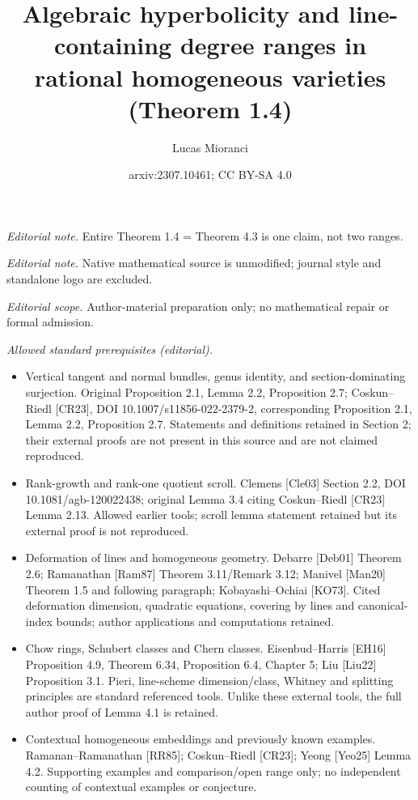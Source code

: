 \documentclass[10pt,a4paper]{article}
\title{Algebraic hyperbolicity and line-containing degree ranges in rational homogeneous varieties (Theorem 1.4)}
\author{Lucas Mioranci}
\date{arxiv:2307.10461; CC BY-SA 4.0}
\numberwithin{equation}{section}
\theoremstyle{definition}
\theoremstyle{remark}
\begin{document}
\maketitle
\noindent\textit{Editorial note.} Entire Theorem 1.4 = Theorem 4.3 is one claim, not two ranges.\par\medskip
\noindent\textit{Editorial note.} Native mathematical source is unmodified; journal style and standalone logo are excluded.\par\medskip
\noindent\textit{Editorial scope.} Author-material preparation only; no mathematical repair or formal admission.\par\medskip
\noindent\textit{Allowed standard prerequisites (editorial).}\begin{itemize}
\item Vertical tangent and normal bundles, genus identity, and section-dominating surjection. Original Proposition 2.1, Lemma 2.2, Proposition 2.7; Coskun–Riedl [CR23], DOI 10.1007/s11856-022-2379-2, corresponding Proposition 2.1, Lemma 2.2, Proposition 2.7. Statements and definitions retained in Section 2; their external proofs are not present in this source and are not claimed reproduced.
\item Rank-growth and rank-one quotient scroll. Clemens [Cle03] Section 2.2, DOI 10.1081/agb-120022438; original Lemma 3.4 citing Coskun–Riedl [CR23] Lemma 2.13. Allowed earlier tools; scroll lemma statement retained but its external proof is not reproduced.
\item Deformation of lines and homogeneous geometry. Debarre [Deb01] Theorem 2.6; Ramanathan [Ram87] Theorem 3.11/Remark 3.12; Manivel [Man20] Theorem 1.5 and following paragraph; Kobayashi–Ochiai [KO73]. Cited deformation dimension, quadratic equations, covering by lines and canonical-index bounds; author applications and computations retained.
\item Chow rings, Schubert classes and Chern classes. Eisenbud–Harris [EH16] Proposition 4.9, Theorem 6.34, Proposition 6.4, Chapter 5; Liu [Liu22] Proposition 3.1. Pieri, line-scheme dimension/class, Whitney and splitting principles are standard referenced tools. Unlike these external tools, the full author proof of Lemma 4.1 is retained.
\item Contextual homogeneous embeddings and previously known examples. Ramanan–Ramanathan [RR85]; Coskun–Riedl [CR23]; Yeong [Yeo25] Lemma 4.2. Supporting examples and comparison/open range only; no independent counting of contextual examples or conjecture.
\end{itemize}\medskip
\end{document}
